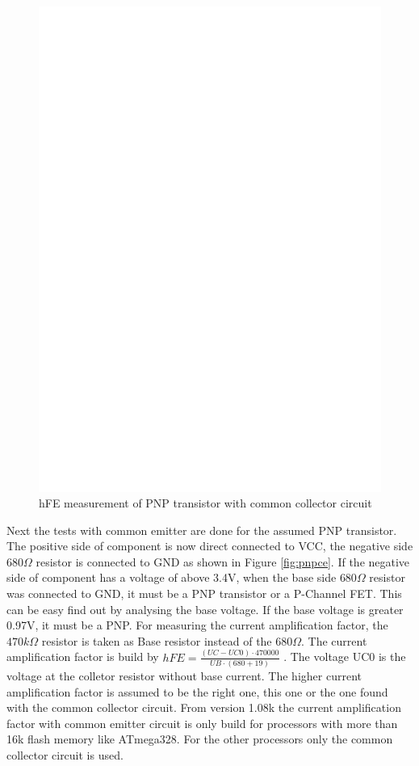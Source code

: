 \begin{figure}[H]
\centering
\includegraphics[]{../FIG/PNPcc.eps}
\caption{hFE measurement of PNP transistor with common collector circuit }
\label{fig:pnpcc}
\end{figure}

Next the tests with common emitter are done for the assumed PNP transistor.
The positive side of component is now direct connected to VCC, the negative side \(680\Omega\) resistor
is connected to GND as shown in Figure \ref{fig:pnpce}. 
If the negative side of component has a voltage of above 3.4V, when the base side \(680\Omega\) resistor 
was connected to GND, it must be a PNP transistor or a P-Channel FET. This can be easy find out by
analysing the base voltage. If the base voltage is greater 0.97V, it must be a PNP.
For measuring the current amplification factor, the \(470k\Omega\) resistor is taken as Base resistor
instead of the \(680\Omega\).
The current amplification factor is build by \(hFE = \frac{(UC-UC0) \cdot 470000}{UB \cdot (680+19)}\) .
The voltage UC0 is the voltage at the colletor resistor without base current.
The higher current amplification factor is assumed to be the right one, this one or the one found with
the common collector circuit.
From version 1.08k the current amplification factor with common emitter circuit is only build for processors
with more than 16k flash memory like ATmega328. For the other processors only the common collector circuit is used.


